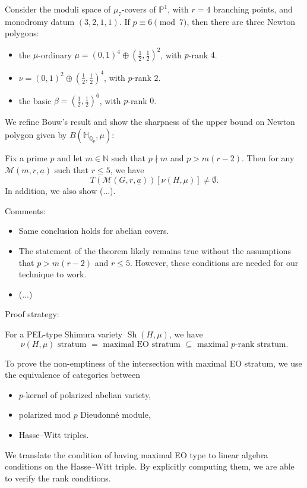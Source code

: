 \documentclass[reqno]{amsart} 
\begin{document}
\begin{example}
  Consider the moduli space of $\mu_7$-covers of $\mathbb{P}^1$, with $r =4$ branching points, and monodromy datum $(3, 2, 1, 1)$.  If $p \equiv 6 \pmod{7}$, then there are three Newton polygons:
  \begin{itemize}
  \item the $\mu$-ordinary $\mu =(0,1)^4 \oplus(\tfrac{1}{2}, \tfrac{1}{2})^2$, with $p$-rank $4$.
  \item $\nu =(0, 1)^2 \oplus(\tfrac{1}{2}, \tfrac{1}{2} )^4$, with $p$-rank $2$.
  \item the basic $\beta =(\tfrac{1}{2}, \tfrac{1}{2} )^6$, with $p$-rank $0$.
  \end{itemize}
\end{example}

We refine Bouw's result and show the sharpness of the upper bound on Newton polygon given by $B(\mathbb{H}_{\mathbb{Q}_p}, \mu)$:
\begin{theorem}
  Fix a prime $p$ and let $m \in \mathbb{N}$ such that $p \nmid m$ and $p > m(r - 2)$.  Then for any $\mathcal{M}(m, r, \underline{a})$ such that $r \leq 5$, we have
  \begin{equation*}
    T(\mathcal{M}(G, r, \underline{a}))[\nu(H, \mu)] \neq \emptyset.
  \end{equation*}
  In addition, we also show (...).
\end{theorem}

Comments:
\begin{itemize}
\item Same conclusion holds for abelian covers.
\item The statement of the theorem likely remains true without the assumptions that $p > m(r - 2)$ and $r \leq 5$.  However, these conditions are needed for our technique to work.
\item (...)
\end{itemize}

Proof strategy:
\begin{theorem}[Moonen, 2004]
  For a PEL-type Shimura variety $\operatorname{Sh}(H, \mu)$, we have
  \begin{equation*}
    \nu(H, \mu) \text{ stratum }
    =
    \text{ maximal EO stratum }
    \subseteq \text{ maximal $p$-rank stratum.}
  \end{equation*}
\end{theorem}
To prove the non-emptiness of the intersection with maximal EO stratum, we use the equivalence of categories between
\begin{itemize}
\item $p$-kernel of polarized abelian variety,
\item polarized mod $p$ Dieudonn{\'e} module,
\item Hasse--Witt triples.
\end{itemize}
We translate the condition of having maximal EO type to linear algebra conditions on the Hasse--Witt triple.  By explicitly computing them, we are able to verify the rank conditions.
\end{document}
